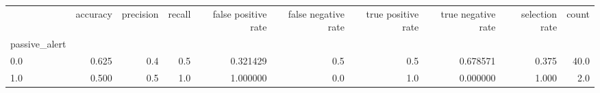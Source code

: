 \begin{tabular}{lrrrrrrrrr}
\toprule
{} &  accuracy &  precision &  recall &  false positive rate &  false negative rate &  true positive rate &  true negative rate &  selection rate &  count \\
passive\_alert &           &            &         &                      &                      &                     &                     &                 &        \\
\midrule
0.0           &     0.625 &        0.4 &     0.5 &             0.321429 &                  0.5 &                 0.5 &            0.678571 &           0.375 &   40.0 \\
1.0           &     0.500 &        0.5 &     1.0 &             1.000000 &                  0.0 &                 1.0 &            0.000000 &           1.000 &    2.0 \\
\bottomrule
\end{tabular}

